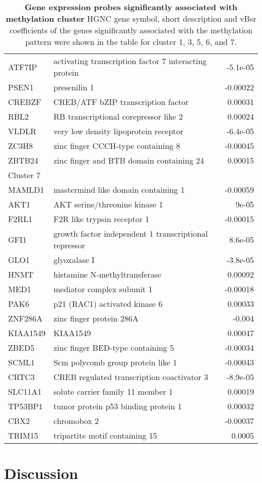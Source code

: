 \documentclass{article}
\begin{document}
\begin{table*}[ht!]
\begin{tabular}{llr}
  ATF7IP & activating transcription factor 7 interacting protein & -5.1e-05 \\ 
  PSEN1 & presenilin 1 & -0.00022 \\ 
  CREBZF & CREB/ATF bZIP transcription factor & 0.00031 \\ 
  RBL2 & RB transcriptional corepressor like 2 & 0.00024 \\ 
  VLDLR & very low density lipoprotein receptor & -6.4e-05 \\ 
  ZC3H8 & zinc finger CCCH-type containing 8 & -0.00045 \\ 
  ZBTB24 & zinc finger and BTB domain containing 24 & 0.00015 \\ 
  \midrule
  Cluster 7 \\
  \midrule
  MAMLD1 & mastermind like domain containing 1 & -0.00059 \\ 
  AKT1 & AKT serine/threonine kinase 1 & 9e-05 \\ 
  F2RL1 & F2R like trypsin receptor 1 & -0.00015 \\ 
  GFI1 & growth factor independent 1 transcriptional repressor & 8.6e-05 \\ 
  GLO1 & glyoxalase I & -3.8e-05 \\ 
  HNMT & histamine N-methyltransferase & 0.00092 \\ 
  MED1 & mediator complex subunit 1 & -0.00018 \\ 
  PAK6 & p21 (RAC1) activated kinase 6 & 0.00033 \\ 
  ZNF286A & zinc finger protein 286A & -0.004 \\ 
  KIAA1549 & KIAA1549 & 0.00047 \\ 
  ZBED5 & zinc finger BED-type containing 5 & -0.00034 \\ 
  SCML1 & Scm polycomb group protein like 1 & -0.00043 \\ 
  CRTC3 & CREB regulated transcription coactivator 3 & -8.9e-05 \\ 
  SLC11A1 & solute carrier family 11 member 1 & 0.00019 \\ 
  TP53BP1 & tumor protein p53 binding protein 1 & 0.00032 \\ 
  CBX2 & chromobox 2 & -0.00037 \\ 
  TRIM15 & tripartite motif containing 15 & 0.0005 \\ 
   \bottomrule
\end{tabular}
\label{genes}
\caption{\textbf{Gene expression probes significantly associated with methylation cluster} HGNC gene symbol, short description and vBsr coefficients of the genes significantly associated with the methylation pattern were shown in the table for cluster 1, 3, 5, 6, and 7. }
\end{table*}

\section{Discussion}



\end{document}
